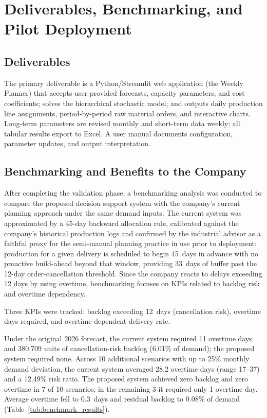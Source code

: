 \documentclass[11pt]{article}
\begin{document}
\section{Deliverables, Benchmarking, and Pilot Deployment}
\subsection{Deliverables}

The primary deliverable is a Python/Streamlit web application (the Weekly Planner) that accepts user-provided forecasts, capacity parameters, and cost coefficients; solves the hierarchical stochastic model; and outputs daily production line assignments, period-by-period raw material orders, and interactive charts. Long-term parameters are revised monthly and short-term data weekly; all tabular results export to Excel. A user manual documents configuration, parameter updates, and output interpretation.


\subsection{Benchmarking and Benefits to the Company}

After completing the validation phase, a benchmarking analysis was conducted to compare the proposed decision support system with the company’s current planning approach under the same demand inputs. The current system was approximated by a 45-day backward allocation rule, calibrated against the company’s historical production logs and confirmed by the industrial advisor as a faithful proxy for the semi-manual planning practice in use prior to deployment: production for a given delivery is scheduled to begin 45~days in advance with no proactive build-ahead beyond that window, providing 33~days of buffer past the 12-day order-cancellation threshold. Since the company reacts to delays exceeding 12 days by using overtime, benchmarking focuses on KPIs related to backlog risk and overtime dependency.

Three KPIs were tracked: backlog exceeding 12~days (cancellation risk), overtime days required, and overtime-dependent delivery rate.

Under the original 2026 forecast, the current system required 11 overtime days and 380,709 units of cancellation-risk backlog (6.01\% of demand); the proposed system required none. Across 10 additional scenarios with up to 25\% monthly demand deviation, the current system averaged 28.2 overtime days (range 17--37) and a 12.49\% risk ratio. The proposed system achieved zero backlog and zero overtime in 7 of 10 scenarios; in the remaining 3 it required only 1 overtime day. Average overtime fell to 0.3~days and residual backlog to 0.08\% of demand (Table~\ref{tab:benchmark_results}).
\end{document}

